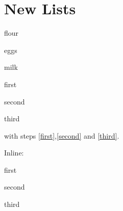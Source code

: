 \documentclass{article}
\begin{document}
\section{New Lists}



\begin{ingredients}
\item flour
\item eggs
\item milk
\end{ingredients}

\begin{steps}
\item first\label{first}
\item second\label{second}
\item third\label{third}
\end{steps}
with steps \ref{first},\ref{second} and \ref{third}.

Inline:
\begin{isteps}
\item first
\item second
\item third
\end{isteps}
\end{document}
